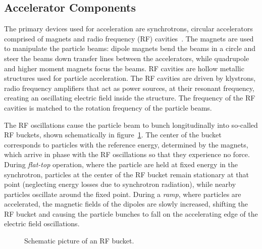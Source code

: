 \subsection{Accelerator Components}
The primary devices used for acceleration are synchrotrons, circular accelerators comprised of magnets and radio frequency (RF) cavities~\cite{wiedemann2007particle}. The magnets are used to manipulate the particle beams: dipole magnets bend the beams in a circle and steer the beams down transfer lines between the accelerators, while quadrupole and higher moment magnets focus the beams. RF cavities are hollow metallic structures used for particle acceleration. The RF cavities are driven by klystrons, radio frequency amplifiers that act as power sources, at their resonant frequency, creating an oscillating electric field inside the structure. The frequency of the RF cavities is matched to the rotation frequency of the particle beams.

The RF oscillations cause the particle beam to bunch longitudinally into so-called RF buckets, shown schematically in figure~\ref{fig:RF-bucket}. The center of the bucket corresponds to particles with the reference energy, determined by the magnets, which arrive in phase with the RF oscillations so that they experience no force. During \emph{flat-top} operation, where the particle are held at fixed energy in the synchrotron, particles at the center of the RF bucket remain stationary at that point (neglecting energy losses due to synchrotron radiation), while nearby particles oscillate around the fixed point. During a \emph{ramp}, where particles are accelerated, the magnetic fields of the dipoles are slowly increased, shifting the RF bucket and causing the particle bunches to fall on the accelerating edge of the electric field oscillations. 

\begin{figure}[htbp]
	\centering
	\caption{Schematic picture of an RF bucket.}
	\label{fig:RF-bucket}
\end{figure}

